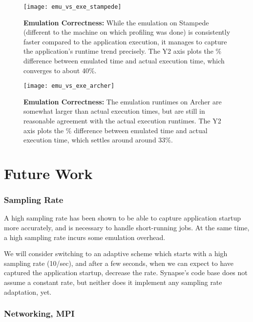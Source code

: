 \documentclass[10pt, conference, compsocconf]{IEEEtran}
\newcommand{\synapse}{Synapse\xspace}
\begin{document}
 \begin{figure}[t]
   \centering
   \texttt{[image: emu\_vs\_exe\_stampede]}
   \caption{\textbf{Emulation Correctness:} While the emulation on Stampede
     (different to the machine on which profiling was done) is consistently
     faster compared to the application execution, it manages to capture the
     application's runtime trend precisely. The Y2 axis plots the \% difference
     between emulated time and actual execution time, which converges to about
     40\%.
    \label{fig:exe_emu_stampede} 
   } 
   \end{figure}

 \begin{figure}[t]
   \centering
   \texttt{[image: emu\_vs\_exe\_archer]}
   \caption{\textbf{Emulation Correctness:} The emulation runtimes on
       Archer are somewhat larger than actual execution times, but are
       still in reasonable agreement with the actual execution
       runtimes. The Y2 axis plots the \% difference between emulated
       time and actual execution time, which settles around around
       33\%.
       \label{fig:exe_emu_archer} 
   } 
   \end{figure}

\section{Future Work} 
\label{sec:future}

 \subsubsection*{Sampling Rate}

 A high sampling rate has been shown to be able to capture application startup
 more accurately, and is necessary to handle short-running jobs.  At the same
 time, a high sampling rate incurs some emulation overhead.

 We will consider switching to an adaptive scheme which starts with a high
 sampling rate (10/sec), and after a few seconds, when we can expect to have
 captured the application startup, decrease the rate.  \synapse's code base does
 not assume a constant rate, but neither does it implement any sampling rate
 adaptation, yet.

 \subsubsection*{Networking, MPI}
\end{document}
